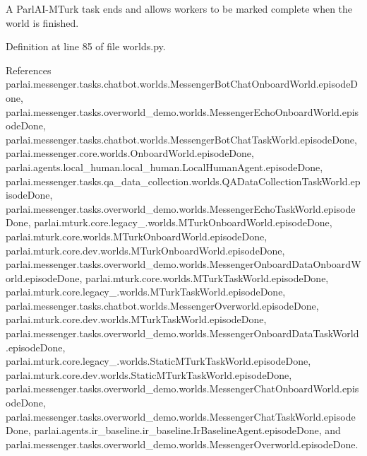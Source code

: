 \begin{DoxyVerb}A ParlAI-MTurk task ends and allows workers to be marked complete
when the world is finished.
\end{DoxyVerb}
 

Definition at line 85 of file worlds.\+py.



References parlai.\+messenger.\+tasks.\+chatbot.\+worlds.\+Messenger\+Bot\+Chat\+Onboard\+World.\+episode\+Done, parlai.\+messenger.\+tasks.\+overworld\+\_\+demo.\+worlds.\+Messenger\+Echo\+Onboard\+World.\+episode\+Done, parlai.\+messenger.\+tasks.\+chatbot.\+worlds.\+Messenger\+Bot\+Chat\+Task\+World.\+episode\+Done, parlai.\+messenger.\+core.\+worlds.\+Onboard\+World.\+episode\+Done, parlai.\+agents.\+local\+\_\+human.\+local\+\_\+human.\+Local\+Human\+Agent.\+episode\+Done, parlai.\+messenger.\+tasks.\+qa\+\_\+data\+\_\+collection.\+worlds.\+Q\+A\+Data\+Collection\+Task\+World.\+episode\+Done, parlai.\+messenger.\+tasks.\+overworld\+\_\+demo.\+worlds.\+Messenger\+Echo\+Task\+World.\+episode\+Done, parlai.\+mturk.\+core.\+legacy\+\_.\+worlds.\+M\+Turk\+Onboard\+World.\+episode\+Done, parlai.\+mturk.\+core.\+worlds.\+M\+Turk\+Onboard\+World.\+episode\+Done, parlai.\+mturk.\+core.\+dev.\+worlds.\+M\+Turk\+Onboard\+World.\+episode\+Done, parlai.\+messenger.\+tasks.\+overworld\+\_\+demo.\+worlds.\+Messenger\+Onboard\+Data\+Onboard\+World.\+episode\+Done, parlai.\+mturk.\+core.\+worlds.\+M\+Turk\+Task\+World.\+episode\+Done, parlai.\+mturk.\+core.\+legacy\+\_.\+worlds.\+M\+Turk\+Task\+World.\+episode\+Done, parlai.\+messenger.\+tasks.\+chatbot.\+worlds.\+Messenger\+Overworld.\+episode\+Done, parlai.\+mturk.\+core.\+dev.\+worlds.\+M\+Turk\+Task\+World.\+episode\+Done, parlai.\+messenger.\+tasks.\+overworld\+\_\+demo.\+worlds.\+Messenger\+Onboard\+Data\+Task\+World.\+episode\+Done, parlai.\+mturk.\+core.\+legacy\+\_.\+worlds.\+Static\+M\+Turk\+Task\+World.\+episode\+Done, parlai.\+mturk.\+core.\+dev.\+worlds.\+Static\+M\+Turk\+Task\+World.\+episode\+Done, parlai.\+messenger.\+tasks.\+overworld\+\_\+demo.\+worlds.\+Messenger\+Chat\+Onboard\+World.\+episode\+Done, parlai.\+messenger.\+tasks.\+overworld\+\_\+demo.\+worlds.\+Messenger\+Chat\+Task\+World.\+episode\+Done, parlai.\+agents.\+ir\+\_\+baseline.\+ir\+\_\+baseline.\+Ir\+Baseline\+Agent.\+episode\+Done, and parlai.\+messenger.\+tasks.\+overworld\+\_\+demo.\+worlds.\+Messenger\+Overworld.\+episode\+Done.

\mbox{\label{classparlai_1_1mturk_1_1core_1_1worlds_1_1MTurkTaskWorld_aafb537fad9c12b4371599b0559d37c42}} 
